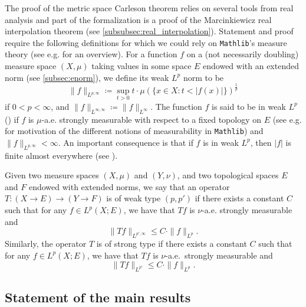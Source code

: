 \documentclass[12pt]{amsart}
\newcommand{\mathlib}{\texttt{Mathlib}\xspace}
\theoremstyle{definition}
\theoremstyle{plain}
\begin{document}
The proof of the metric space Carleson theorem relies on several tools from real analysis and part of the formalization is a proof of the Marcinkiewicz real interpolation theorem (see \ref{subsubsec:real_interpolation}). Statement and proof require the following definitions for which we could rely on \mathlib's measure theory (see e.g. \cite{vanDoornFormalizedHaarMeasure} for an overview).
For a function $f$ on a (not necessarily doubling) measure space $(X,\mu)$ taking values in some space $E$ endowed with an extended norm (see \ref{subsec:enorm}), we define its weak $L^p$ norm to be
\begin{equation}
  \|f\|_{L^{p,\infty}} \coloneq \sup_{t>0} t \cdot \mu (\{x\in X : t < |f(x)| \}) ^ \frac{1}{p}
\end{equation}
if $0<p<\infty$, and $\|f\|_{L^{\infty,\infty}} \coloneq \|f\|_{L^{\infty}}$.
The function $f$ is said to be in weak $L^p$ () if $f$ is $\mu$-a.e. strongly measurable with respect to a fixed topology on $E$ (see e.g. \cite{vanDoornFormalizedHaarMeasure, GouezelChangeOfVariables} for motivation of the different notions of measurability in \mathlib) and $\|f\|_{L^{p,\infty}} < \infty$.
An important consequence is that if $f$ is in weak $L^p$, then $|f|$ is finite almost everywhere (see ).

Given two measure spaces $(X,\mu)$ and $(Y,\nu)$, and two topological spaces $E$ and $F$ endowed with extended norms, we say that an operator $T : (X \to E) \to (Y \to F)$ is of weak type $(p,p')$ if there exists a constant $C$ such that for any $f\in L^p(X; E)$, we have that $T f$ is $\nu$-a.e. strongly measurable and
\begin{equation}
  \|T f\|_{L^{p',\infty}} \le C \cdot \|f\|_{L^p}.
\end{equation}
Similarly, the operator $T$ is of strong type if there exists a constant $C$ such that for any $f\in L^p(X; E)$, we have that $T f$ is $\nu$-a.e.\ strongly measurable and
\begin{equation}
  \|T f\|_{L^{p'}} \le C \cdot \|f\|_{L^p}.
\end{equation}


\subsection{Statement of the main results}\label{subsec:main_results}
\end{document}

